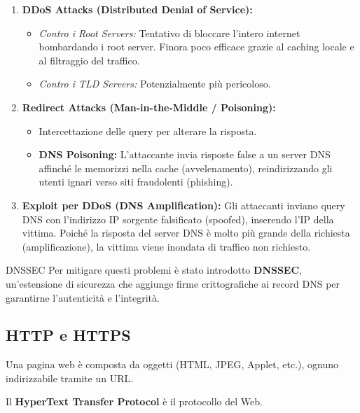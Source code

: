 \documentclass[a4paper,12pt]{report}
\begin{document}
\begin{enumerate}
    \item \textbf{DDoS Attacks (Distributed Denial of Service):}
    \begin{itemize}
        \item \textit{Contro i Root Servers:} Tentativo di bloccare l'intero internet bombardando i root server. Finora poco efficace grazie al caching locale e al filtraggio del traffico.
        \item \textit{Contro i TLD Servers:} Potenzialmente più pericoloso.
    \end{itemize}
    
    \item \textbf{Redirect Attacks (Man-in-the-Middle / Poisoning):}
    \begin{itemize}
    \item Intercettazione delle query per alterare la risposta.
        \item \textbf{DNS Poisoning:} L'attaccante invia risposte false a un server DNS affinché le memorizzi nella cache (avvelenamento), reindirizzando gli utenti ignari verso siti fraudolenti (phishing).
        
    \end{itemize}
    
    \item \textbf{Exploit per DDoS (DNS Amplification):}
    Gli attaccanti inviano query DNS con l'indirizzo IP sorgente falsificato (spoofed), inserendo l'IP della vittima. Poiché la risposta del server DNS è molto più grande della richiesta (amplificazione), la vittima viene inondata di traffico non richiesto.
\end{enumerate}

\begin{notebox}{DNSSEC}
Per mitigare questi problemi è stato introdotto \textbf{DNSSEC}, un'estensione di sicurezza che aggiunge firme crittografiche ai record DNS per garantirne l'autenticità e l'integrità.
\end{notebox}

\newpage
\subsection{HTTP e HTTPS}


Una pagina web è composta da oggetti (HTML, JPEG, Applet, etc.), ognuno indirizzabile tramite un URL.

Il \textbf{HyperText Transfer Protocol} è il protocollo del Web.
\end{document}
